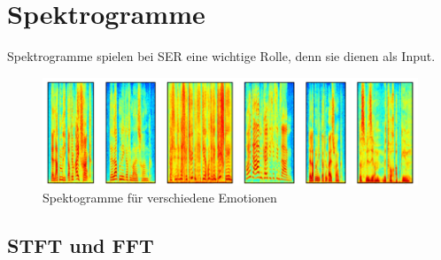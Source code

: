 \section{Spektrogramme}
Spektrogramme spielen bei SER eine wichtige Rolle, denn sie dienen als Input. 
\begin{figure}
	\centering
	\includegraphics[width=1\textwidth]{images/spekto.PNG}
	\caption{\label{spektogram}Spektogramme für verschiedene Emotionen \cite{badshah2019deep}}
\end{figure}
\subsection{STFT und FFT}







